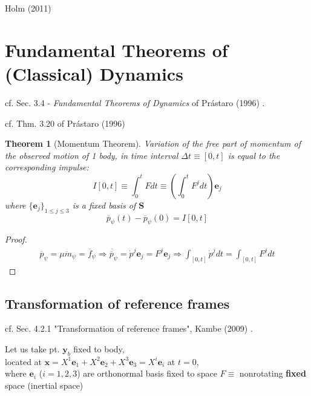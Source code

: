 \documentclass[10pt]{amsart}
\newtheorem{theorem}{Theorem}
\begin{document}
\begin{multicols*}{2}
Holm (2011) \cite{Holm2011}


\section{Fundamental Theorems of (Classical) Dynamics}

cf. Sec. 3.4 - \emph{Fundamental Theorems of Dynamics} of Pr\'{a}staro (1996) \cite{Pras1996}.

cf. Thm. 3.20 of Pr\'{a}staro (1996) \cite{Pras1996}
\begin{theorem}[Momentum Theorem]
	Variation of the free part of momentum of the observed motion of 1 body, in time interval $\Delta t \equiv [0, t]$ is equal to the corresponding impulse:
	\begin{equation}
	I[0,t] \equiv \int_0^t Fdt \equiv \left( \int_0^t F^j dt \right) \mathbf{e}_j
	\end{equation}
	where $\lbrace \mathbf{e}_j \rbrace_{1 \leq j \leq 3}$ is a fixed basis of $\mathbf{S}$
	\begin{equation}
		\overline{p}_{\psi}(t) - \overline{p}_{\psi}(0) = I[0,t]
	\end{equation}
\end{theorem}

\begin{proof}
	\[
\begin{gathered}
\overline{p}_{\psi} = \mu \ddot{m}_{\psi} = \overline{f}_{\psi} \Longrightarrow \dot{ \overline{p}_{\psi}} = \dot{p}^j \mathbf{e}_j = F^j \textbf{e}_j \Longrightarrow \int_{[0,t]} \dot{p}^j dt = \int_{[0,t]}F^j dt
\end{gathered}
	\]
	\end{proof}

\subsection{Transformation of reference frames}

cf. Sec. 4.2.1 "Transformation of reference frames", Kambe (2009) \cite{TKambe2009}.

Let us take pt. $\mathbf{y}_b$ fixed to body, \\
located at $\mathbf{x} = X^1 \mathbf{e}_1 + X^2 \mathbf{e}_2 + X^3 \mathbf{e}_3 = X^i \mathbf{e}_i$ at $t=0$, \\
where $\mathbf{e}_i$ ($i=1,2,3$) are orthonormal basis fixed to space $F \equiv$ nonrotating \textbf{fixed} space (inertial space) \\


\end{multicols*}
\end{document}
